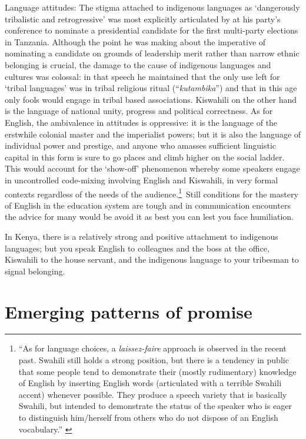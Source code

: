 \documentclass[output=paper,colorlinks,citecolor=brown]{langscibook}
\begin{document}
Language attitudes: The stigma attached to indigenous languages as ‘dangerously tribalistic and retrogressive’ was most explicitly articulated by \citet{Nyerere1995} at his party’s conference to nominate a presidential candidate for the first multi-party elections in Tanzania. Although the point he was making about the imperative of nominating a candidate on grounds of leadership merit rather than narrow ethnic belonging is crucial, the damage to the cause of indigenous languages and cultures was colossal: in that speech he maintained that the only use left for ‘tribal languages’ was in tribal religious ritual (“\textit{kutambika}”) and that in this age only fools would engage in tribal based associations. Kiswahili on the other hand is the language of national unity, progress and political correctness. As for English, the ambivalence in attitudes is oppressive: it is the language of the erstwhile colonial master and the imperialist powers; but it is also the language of individual power and prestige, and anyone who amasses sufficient linguistic capital in this form is sure to go places and climb higher on the social ladder. This would account for the ‘show-off’ phenomenon whereby some speakers engage in uncontrolled code-mixing involving English and Kiswahili, in very formal contexts regardless of the needs of the audience.\footnote{“As for language choices, a \textit{laissez-faire} approach is observed in the recent past. Swahili still holds a strong position, but there is a tendency in public that some people tend to demonstrate their (mostly rudimentary) knowledge of English by inserting English words (articulated with a terrible Swahili accent) whenever possible. They produce a speech variety that is basically Swahili, but intended to demonstrate the status of the speaker who is eager to distinguish him/herself from others who do not dispose of an English vocabulary.” \citep[54]{Legere2010}}~Still conditions for the mastery of English in the education system are tough and in communication encounters the advice for many would be avoid it as best you can lest you face humiliation.

In Kenya, there is a relatively strong and positive attachment to indigenous languages; but you speak English to colleagues and the boss at the office, Kiswahili to the house servant, and the indigenous language to your tribesman to signal belonging.

\section{Emerging patterns of promise}\label{sec:kioko:3}
\end{document}
